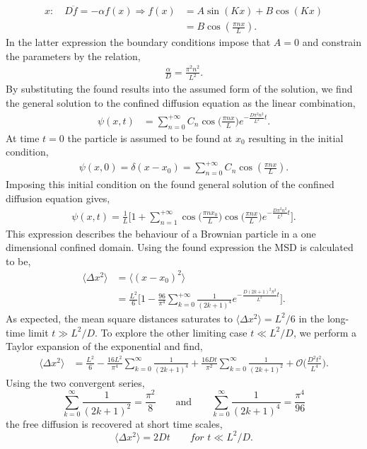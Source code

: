 \begin{align}
  x:\quad D \ddot{f} = - \alpha f(x) \Rightarrow f(x) &= A \sin(K x) + B \cos(Kx)\\
  &= B \cos(\frac{\pi n x}{L}).
\end{align}
In the latter expression the boundary conditions impose that $A=0$ and constrain the
parameters by the relation,
\begin{align}
  \frac{\alpha}{D} = \frac{\pi^2 n^2}{L^2}.
\end{align}
By substituting the found results into the assumed form of the solution, we find the
general solution to the confined diffusion equation as the linear combination,
\begin{align}
  \psi(x,t) &= \sum_{n=0}^{+\infty} C_n \cos\Big(\frac{\pi n x}{L}\Big) e^{- \frac{D\pi^2
  n^2}{L^2}t}.
\end{align}
At time $t=0$ the particle is assumed to be found at $x_0$ resulting in the initial
condition,
\begin{align}
  \psi(x, 0) = \delta(x-x_0) = \sum_{n=0}^{+ \infty} C_n \cos(\frac{\pi n x}{L}).
\end{align}
Imposing this initial condition on the found general solution of the confined diffusion
equation gives,
\begin{align}
  \psi(x, t)=\frac{1}{L} \Bigg[ 1 + \sum_{n=1}^{+\infty} \cos\Big(\frac{\pi n
  x_0}{L}\Big) \cos\Big(\frac{\pi n x}{L}\Big) e^{- \frac{D\pi^2  n^2}{L^2}t}\Bigg].
\end{align}
This expression describes the behaviour of a Brownian particle in a one dimensional
confined domain. Using the found expression the MSD is calculated to be,
\begin{align}
  \langle \Delta x^2 \rangle &= \langle(x-x_0)^2\rangle\\&= \frac{L^2}{6}\Bigg[1 -
  \frac{96}{\pi^4}
  \sum_{k=0}^{+\infty} \frac{1}{(2k+1)^4} e^{- \frac{D(2k+1)^2 \pi^2}{L^2}t}\Bigg].
\end{align}
As expected, the mean square distances saturates to $\langle \Delta x^2 \rangle = L^2/6$
in the long-time limit $t \gg L^2 / D.$ To explore the other limiting case $t \ll L^2/D
$, we perform a Taylor expansion of the exponential and find,
\begin{align}
  \langle \Delta x^2 \rangle &= \frac{L^2}{6} - \frac{16 L^2}{\pi^4} \sum_{k=0}^{\infty}
  \frac{1}{(2k+1)^4} + \frac{16 D t}{\pi^2} \sum_{k=0}^{\infty} \frac{1}{(2k+1)^2} +
  \mathcal{O}\bigg(\frac{D^2 t^2}{L^4}\bigg).
\end{align}
Using the two convergent series,
\begin{equation}
  \sum_{k=0}^{\infty} \frac{1}{(2k+1)^2} = \frac{\pi^2}{8} \qquad \text{and} \qquad
  \sum_{k=0}^{\infty} \frac{1}{(2k+1)^4} = \frac{\pi^4}{96}
\end{equation}
the free diffusion is recovered at short time scales, \cite{BICKEL200724}
\begin{equation}
\langle \Delta x^2 \rangle = 2Dt \qquad for\,\, t \ll L^2/D.
\end{equation}
